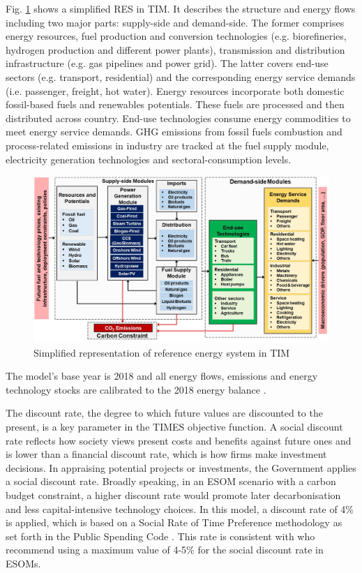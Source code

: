 \documentclass[gmd,manuscript]{copernicus}
\begin{document}
Fig. \ref{fig:TIM-RES} shows a simplified RES in TIM. It describes the structure and energy flows including two major parts: supply-side and demand-side. The former comprises energy resources, fuel production and conversion technologies (e.g. biorefineries, hydrogen production and different power plants), transmission and distribution infrastructure (e.g. gas pipelines and power grid). The latter covers end-use sectors (e.g. transport, residential) and the corresponding energy service demands (i.e. passenger, freight, hot water). Energy resources incorporate both domestic fossil-based fuels and renewables potentials. These fuels are processed and then distributed across country. End-use technologies consume energy commodities to meet energy service demands. GHG emissions from fossil fuels combustion and process-related emissions in industry are tracked at the fuel supply module, electricity generation technologies and sectoral-consumption levels. 

\begin{figure}[ht]
 \centering
 \includegraphics[scale=0.6]{figures/TIM_RES.jpg} 
 \caption{Simplified representation of reference energy system in TIM}
 \label{fig:TIM-RES}
\end{figure}

The model's base year is 2018 and all energy flows, emissions and energy technology stocks are calibrated to the 2018 energy balance \citep{SEAI2019}.

The discount rate, the degree to which future values are discounted to the present, is a key parameter in the TIMES objective function. A social discount rate reflects how society views present costs and benefits against future ones and is lower than a financial discount rate, which is how firms make investment decisions. In appraising potential projects or investments, the Government applies a social discount rate. Broadly speaking, in an ESOM scenario with a carbon budget constraint, a higher discount rate would promote later decarbonisation and less capital-intensive technology choices. In this model, a discount rate of 4\% is applied, which is based on a Social Rate of Time Preference methodology as set forth in the Public Spending Code \citep{OCallaghan2018}. This rate is consistent with \citet{Garcia-Gusano2016} who recommend using a maximum value of 4-5\% for the social discount rate in ESOMs. 
\end{document}
